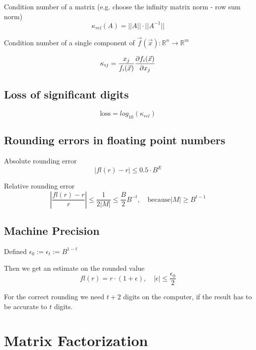\documentclass[
    a4paper,
    11pt
]{article}
\begin{document}
Condition number of a matrix (e.g. choose the infinity matrix norm - row sum
norm)
\begin{equation}
    \kappa_{rel}(A) = ||A|| \cdot ||A^{-1}||
\end{equation}

Condition number of a single component of $\vec{f}(\vec{x}) : \mathbb{R}^n
\to \mathbb{R}^m$

\begin{equation}
    \kappa_{ij} = \frac{x_j}{f_i(\vec{x})} \pdv{f_i(\vec{x})}{x_j}
\end{equation}

\subsection{Loss of significant digits}

\begin{equation}
    \text{loss} = log_{10}(\kappa_{rel})
\end{equation}

\subsection{Rounding errors in floating point numbers}

Absolute rounding error
\begin{equation}
    |fl(r) - r| \leq 0.5 \cdot B^E
\end{equation}

Relative rounding error
\begin{equation}
    \left| \frac{fl(r) - r}{r} \right| \leq \frac{1}{2|M|} \leq \frac{B}{2}
    B^{-t}, \quad \text{because} |M| \geq B^{t-1}
\end{equation}

\subsection{Machine Precision}

Defined $\epsilon_0 := \epsilon_t := B^{1-t}$

Then we get an estimate on the rounded value
\begin{equation}
    fl(r) = r \cdot (1 + \epsilon), \quad |\epsilon| \leq \frac{\epsilon_0}{2}
\end{equation}

For the correct rounding we need $t+2$ digits on the computer, if the result has
to be accurate to $t$ digits.

\section{Matrix Factorization}
\end{document}
